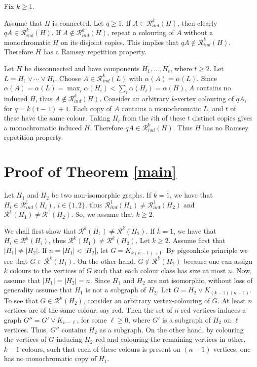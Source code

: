 \documentclass[11pt]{article}
\makeatletter
\theoremstyle{plain}
\theoremstyle{definition}
\renewenvironment{proof}[1][\proofname]
{\par\pushQED{\qed}
	\normalfont\topsep6\p@\@plus6\p@\relax\trivlist
	\item[\hskip\labelsep\bfseries#1\@addpunct{.}]
	\ignorespaces}
{\popQED\endtrivlist\@endpefalse}
\newcommand{\R}{\mathcal{R}}
\newcommand{\Rk}{\R_{ind}}
\makeatother
\begin{document}
\begin{proof}
Fix $k\geq 1$.

Assume that $H$ is connected. Let $q\geq1$. If $A\in\Rk^k(H)$, then clearly $q A\in\Rk^k(H)$.
If $A\not\in\Rk^k(H)$, repeat a colouring of $A$ without a monochromatic $H$ 
on its disjoint copies. This implies that $q A\not \in\Rk^k(H)$. Therefore $H$ has a Ramsey repetition property.

Let $H$  be disconnected and have components $H_1,\ldots,H_t$, where $t\geq2$. Let
$L=H_1\vee\cdots\vee H_t$. Choose
$A\in\Rk^k(L)$ with $ \alpha(A)=\alpha(L)$.     Since $\alpha(A)=\alpha(L)=\max_i\alpha(H_i)<\sum_i\alpha(H_i)=\alpha(H)$,
$A$ contains no induced $H$, thus  $A\not\in \Rk^k(H)$. 
Consider  an arbitrary $k$-vertex colouring of $qA$, for $q=k(t-1)+1$.
Each copy of $A$ contains a  monochromatic
$L$, and $t$ of these have the same colour. Taking $H_i$ from the $i$th
of these $t$ distinct copies gives a monochromatic induced $H$.
Therefore $qA \in \Rk^k(H)$.
Thus $H$ has no Ramsey repetition property.
\end{proof}

 

   
   \section{Proof of Theorem \ref{main}}\label{proof-main}
   Let $H_1$ and $H_2$ be two non-isomorphic graphs. If $k=1$, we have that $H_i\in \Rk^1(H_i)$, $i\in \{1,2\}$,  thus $\Rk^1(H_1)\neq \Rk^1(H_2)$ and  $\R^1(H_1)\neq \R^1(H_2)$.
   So, we assume that  $k\geq 2$.
   
   We shall first show that $\R^k(H_1) \neq \R^k(H_2)$. If $k=1$, we have that $H_i\in \R^k(H_i)$, thus $\R^k(H_1)\neq \R^k(H_2)$. Let $k\geq 2$.
   Assume first that $|H_1|\neq |H_2|$.  If $n=|H_1|<|H_2|$, let  $G=K_{k(n-1)+1}$.  By pigeonhole principle we see that $G\in \R^k(H_1)$. On the other hand, $G\not\in \R^k(H_2)$ because one can assign $k$ colours to the vertices of $G$ such that each colour class has size at most $n$.
   Now, assume that $|H_1|=|H_2|=n$. Since $H_1$ and $H_2$ are not isomorphic, without loss of generality assume that $H_1$ is not a subgraph of $H_2$.
   Let $G=H_2\vee K_{(k-1)(n-1)}$. To see that  $G\in \R^k(H_2)$, consider an arbitrary vertex-colouring of $G$. At least $n$ vertices are of the same colour, say red. Then the set of $n$ red vertices induces 
   a graph $G''=G'\vee K_{n-\ell}$, for some $\ell\geq 0$, where $G'$ is a subgraph of $H_2$ on $\ell$ vertices. Thus, $G''$ contains $H_2$ as a subgraph.
   On the other hand, by colouring the vertices of $G$ inducing  $H_2$ red and colouring  the remaining vertices in other, $k-1$ colours, such that each of these colours is present on $(n-1)$ vertices,  one has no monochromatic copy of $H_1$.\\
 
\end{document}
